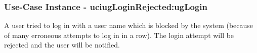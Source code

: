 
	\subsubsection{Use-Case Instance - uciugLoginRejected:ugLogin}
	
	A user tried to log in with a user name which is blocked by the system (because of many erroneous attempts to log in in a row). The login attempt will be rejected and the user will be notified.		  
	\begin{operationmodel}
	
	\end{operationmodel} 

	
